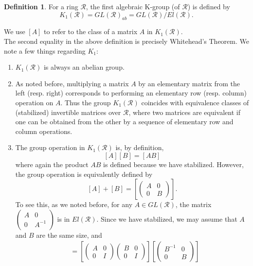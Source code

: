 \documentclass{amsart}
\newcommand{\si}{\index}
\theoremstyle{definition}
\newtheorem{de}[equation]{Definition}
\theoremstyle{definition}
\newcommand{\calR}{\mathcal{R}}
\numberwithin{equation}{subsection}
\begin{document}
\begin{de}
For a ring $\calR$, the first algebraic K-group\si{$K_{1}$ of a ring} (of $\calR$) is defined by
$$K_{1}(\calR) = GL(\calR)_{ab} = GL(\calR) / El(\calR).$$
\end{de}

We use $[A]$ to refer to the class of a matrix $A$ in $K_{1}(\calR)$.\\

The second equality in the above definition is precisely Whitehead's Theorem. We note a few things regarding $K_{1}$:

\begin{enumerate}
\item
$K_{1}(\calR)$ is always an abelian group.
\item
As noted before, multiplying a matrix $A$ by an elementary matrix from the left (resp. right) corresponds to performing an elementary row (resp. column) operation on $A$. Thus the group $K_{1}(\calR)$ coincides with equivalence classes of (stabilized) invertible matrices over $\calR$, where two matrices are equivalent if one can be obtained from the other by a sequence of elementary row and column operations.
\item
The group operation in $K_{1}(\calR)$ is, by definition,
$$[A][B] = [AB]$$
where again the product $AB$ is defined because we have stabilized. However, the group operation is equivalently defined by
$$[A] + [B] = \left[\begin{pmatrix} A & 0 \\ 0 & B \end{pmatrix}\right].$$
To see this, as we noted before, for any $A \in GL(\calR)$, the matrix $\begin{pmatrix} A & 0 \\ 0 & A^{-1} \end{pmatrix}$ is in $El(\calR)$. Since we have stabilized, we may assume that $A$ and $B$ are the same size, and
\begin{align*}
  [AB] &= \left[\begin{pmatrix} A & 0 \\ 0 & I\end{pmatrix} \begin{pmatrix} B & 0 \\ 0 & I \end{pmatrix} \right]\left[\begin{pmatrix} B^{-1} & 0 \\ 0 & B \end{pmatrix}\right]\\

\end{align*}
\end{enumerate}
\end{document}
